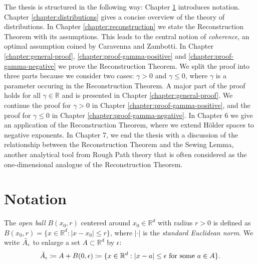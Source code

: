 The thesis is structured in the following way: Chapter \ref{chapter:notation} introduces notation. Chapter \ref{chapter:distributions} gives a concise overview of the theory of distributions. In Chapter \ref{chapter:reconstruction} we state the Reconstruction Theorem with its assumptions. This leads to the central notion of \emph{coherence}, an optimal assumption coined by Caravenna and Zambotti. In Chapter \ref{chapter:general-proof}, \ref{chapter:proof-gamma-positive} and \ref{chapter:proof-gamma-negative} we prove the Reconstruction Theorem. We split the proof into three parts because we consider two cases: $\gamma > 0$ and $\gamma \leq 0$, where $\gamma$ is a parameter occuring in the Reconstruction Theorem. A major part of the proof holds for all $\gamma \in \mathbb{R}$ and is presented in Chapter \ref{chapter:general-proof}. We continue the proof for $\gamma > 0$ in Chapter \ref{chapter:proof-gamma-positive}, and the proof for $\gamma \leq 0$ in Chapter \ref{chapter:proof-gamma-negative}. In Chapter 6 we give an application of the Reconstruction Theorem, where we extend Hölder spaces to negative exponents. In Chapter 7, we end the thesis with a discussion of the relationship between the Reconstruction Theorem and the Sewing Lemma, another analytical tool from Rough Path theory that is often considered as the one-dimensional analogue of the Reconstruction Theorem.


\section{Notation}\label{chapter:notation}

The \emph{open ball} $B(x_0, r)$  centered around $x_0 \in \mathbb{R}^d$ with radius $r > 0$ is defined as $B(x_0,r) = \{ x \in \mathbb{R}^d : |x - x_0| \leq r \}$, where $|\cdot|$ is the \emph{standard Euclidean norm}. We write $\bar{A}_{\epsilon}$ to enlarge a set $A \subset \mathbb{R}^d$ by $\epsilon$: 
\begin{align*}
    \bar{A}_{\epsilon} \coloneqq A + B(0, \epsilon) \coloneqq \{ x \in \mathbb{R}^d : |x - a| \leq \epsilon \text{ for some $a \in A$} \}.
\end{align*}

